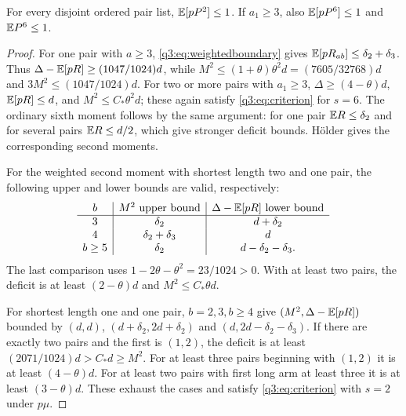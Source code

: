\begin{lemma}\label{q3:lem:pairmoments}
For every disjoint ordered pair list, $\mathbb E[pP^2]\le1$. If $a_1\ge3$, also $\mathbb E[pP^6]\le1$ and $\mathbb E P^6\le1$.
\end{lemma}
\begin{proof}
For one pair with $a\ge3$, \eqref{q3:eq:weightedboundary} gives $\mathbb E[pR_{ab}]\le \delta_{2}+\delta_{3}$. Thus $\Delta-\mathbb E[pR]\ge(1047/1024)d$, while $M^2\le(1+\theta)\theta^2d=(7605/32768)d$ and $3M^2\le(1047/1024)d$. For two or more pairs with $a_1\ge3$, $\Delta\ge(4-\theta)d$, $\mathbb E[pR]\le d$, and $M^2\le C_*\theta^2d$; these again satisfy \eqref{q3:eq:criterion} for $s=6$. The ordinary sixth moment follows by the same argument: for one pair $\mathbb E R\le \delta_{2}$ and for several pairs $\mathbb E R\le d/2$, which give stronger deficit bounds. H\"older gives the corresponding second moments.

For the weighted second moment with shortest length two and one pair, the following upper and lower bounds are valid, respectively:
\[
 \begin{array}{c|c|c}
 b&M^2\text{ upper bound}&\Delta-\mathbb E[pR]\text{ lower bound}\\\hline
 3&\delta_{2}&d+\delta_{2}\\4&\delta_{2}+\delta_{3}&d\\b\ge5&\delta_{2}&d-\delta_{2}-\delta_{3} .
 \end{array}
\]
The last comparison uses $1-2\theta-\theta^2=23/1024>0$. With at least two pairs, the deficit is at least $(2-\theta)d$ and $M^2\le C_*\theta d$.

For shortest length one and one pair, $b=2,3,b\ge4$ give $(M^2,\Delta-\mathbb E[pR])$ bounded by $(d,d)$, $(d+\delta_{2},2d+\delta_{2})$ and $(d,2d-\delta_{2}-\delta_{3})$. If there are exactly two pairs and the first is $(1,2)$, the deficit is at least $(2071/1024)d>C_*d\ge M^2$. For at least three pairs beginning with $(1,2)$ it is at least $(4-\theta)d$. For at least two pairs with first long arm at least three it is at least $(3-\theta)d$. These exhaust the cases and satisfy \eqref{q3:eq:criterion} with $s=2$ under $p\mu$.
\end{proof}


